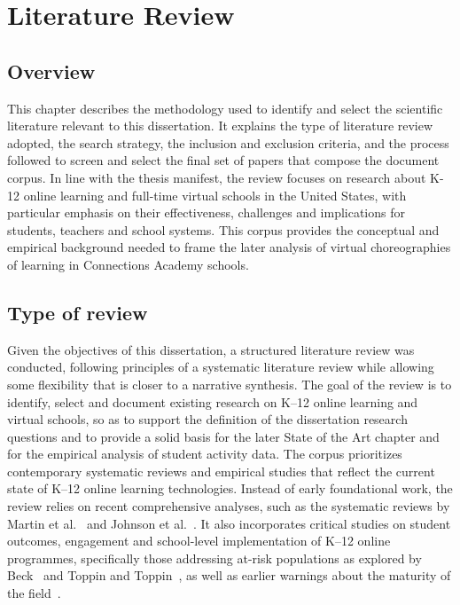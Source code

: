 \chapter{Literature Review}
\label{chap:litreview}


\section{Overview}
This chapter describes the methodology used to identify and select the scientific literature relevant to this dissertation.
It explains the type of literature review adopted, the search strategy, the inclusion and exclusion criteria, and the process followed to screen and select the final set of papers that compose the document corpus.
In line with the thesis manifest, the review focuses on research about K-12 online learning and full-time virtual schools in the United States, with particular emphasis on their effectiveness, challenges and implications for students, teachers and school systems.
This corpus provides the conceptual and empirical background needed to frame the later analysis of virtual choreographies of learning in Connections Academy schools.

\section{Type of review}
Given the objectives of this dissertation, a structured literature review was conducted, following principles of a systematic literature review while allowing some flexibility that is closer to a narrative synthesis.
The goal of the review is to identify, select and document existing research on K--12 online learning and virtual schools, so as to support the definition of the dissertation research questions and to provide a solid basis for the later State of the Art chapter and for the empirical analysis of student activity data.
The corpus prioritizes contemporary systematic reviews and empirical studies that reflect the current state of K--12 online learning technologies.
Instead of early foundational work, the review relies on recent comprehensive analyses, such as the systematic reviews by Martin et al.~\cite{martin_systematic_2020} and Johnson et al.~\cite{online_johnson_2022}.
It also incorporates critical studies on student outcomes, engagement and school-level implementation of K--12 online programmes, specifically those addressing at-risk populations as explored by Beck~\cite{beck_atrisk_2024,beck_prepared_2023} and Toppin and Toppin~\cite{virtual_toppin_2016}, as well as earlier warnings about the maturity of the field~\cite{Barbour2016Virtual}.

